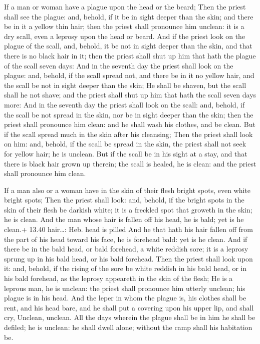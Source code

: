  If a man or woman have a plague upon the head or the
beard;  Then the priest shall see the plague: and, behold,
if it be in sight deeper than the skin; and there be in it a yellow thin
hair; then the priest shall pronounce him unclean: it is a dry scall,
even a leprosy upon the head or beard.  And if the priest
look on the plague of the scall, and, behold, it be not in sight deeper
than the skin, and that there is no black hair in it; then the priest
shall shut up him that hath the plague of the scall seven days:
 And in the seventh day the priest shall look on the
plague: and, behold, if the scall spread not, and there be in it no
yellow hair, and the scall be not in sight deeper than the skin;
 He shall be shaven, but the scall shall he not shave; and
the priest shall shut up him that hath the scall seven days more:
 And in the seventh day the priest shall look on the scall:
and, behold, if the scall be not spread in the skin, nor be in sight
deeper than the skin; then the priest shall pronounce him clean: and he
shall wash his clothes, and be clean.  But if the scall
spread much in the skin after his cleansing;  Then the
priest shall look on him: and, behold, if the scall be spread in the
skin, the priest shall not seek for yellow hair; he is unclean.
 But if the scall be in his sight at a stay, and that there
is black hair grown up therein; the scall is healed, he is clean: and
the priest shall pronounce him clean.

 If a man also or a woman have in the skin of their flesh
bright spots, even white bright spots;  Then the priest
shall look: and, behold, if the bright spots in the skin of their flesh
be darkish white; it is a freckled spot that groweth in the skin; he is
clean.  And the man whose hair is fallen off his head, he
is bald; yet is he clean.+ 13.40 hair\ldots: Heb. head is pilled
 And he that hath his hair fallen off from the part of his
head toward his face, he is forehead bald: yet is he clean.
 And if there be in the bald head, or bald forehead, a
white reddish sore; it is a leprosy sprung up in his bald head, or his
bald forehead.  Then the priest shall look upon it: and,
behold, if the rising of the sore be white reddish in his bald head, or
in his bald forehead, as the leprosy appeareth in the skin of the flesh;
 He is a leprous man, he is unclean: the priest shall
pronounce him utterly unclean; his plague is in his head. 
And the leper in whom the plague is, his clothes shall be rent, and his
head bare, and he shall put a covering upon his upper lip, and shall
cry, Unclean, unclean.  All the days wherein the plague
shall be in him he shall be defiled; he is unclean: he shall dwell
alone; without the camp shall his habitation be.

